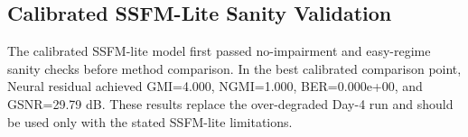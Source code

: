 \subsection{Calibrated SSFM-Lite Sanity Validation}
The calibrated SSFM-lite model first passed no-impairment and easy-regime sanity checks before method comparison. In the best calibrated comparison point, Neural residual achieved GMI=4.000, NGMI=1.000, BER=0.000e+00, and GSNR=29.79 dB. These results replace the over-degraded Day-4 run and should be used only with the stated SSFM-lite limitations.

